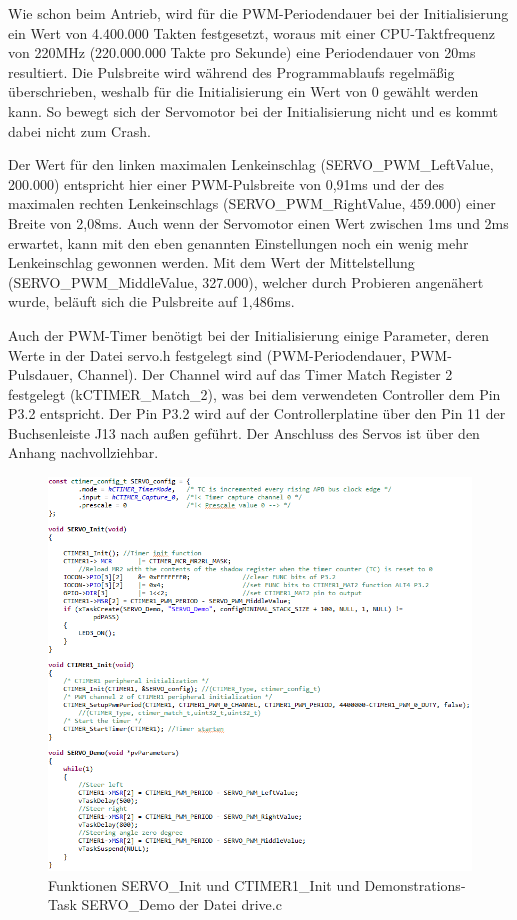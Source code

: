 Wie schon beim Antrieb, wird für die \ac{PWM}-Periodendauer bei der Initialisierung ein Wert von 4.400.000 Takten festgesetzt, woraus mit einer \ac{CPU}-Taktfrequenz von 220MHz (220.000.000 Takte pro Sekunde) eine Periodendauer von 20ms resultiert. Die Pulsbreite wird während des Programmablaufs regelmäßig überschrieben, weshalb für die Initialisierung ein Wert von 0 gewählt werden kann. So bewegt sich der Servomotor bei der Initialisierung nicht und es kommt dabei nicht zum Crash.\vspace{11pt}

Der Wert für den linken maximalen Lenkeinschlag (\glqq{}SERVO\_PWM\_LeftValue\grqq{}, 200.000) entspricht hier einer \ac{PWM}-Pulsbreite von 0,91ms und der des maximalen rechten Lenkeinschlags (\glqq{}SERVO\_PWM\_RightValue\grqq{}, 459.000) einer Breite von 2,08ms. Auch wenn der Servomotor einen Wert zwischen 1ms und 2ms erwartet, kann mit den eben genannten Einstellungen noch ein wenig mehr Lenkeinschlag gewonnen werden. Mit dem Wert der Mittelstellung (\glqq{}SERVO\_PWM\_MiddleValue\grqq{}, 327.000), welcher durch Probieren angenähert wurde, beläuft sich die Pulsbreite auf 1,486ms.\vspace{11pt}

Auch der \ac{PWM}-Timer benötigt bei der Initialisierung einige Parameter, deren Werte in der Datei \glqq{}servo.h\grqq{} festgelegt sind (\ac{PWM}-Periodendauer, \ac{PWM}-Pulsdauer, Channel). Der Channel wird auf das Timer Match Register 2 festgelegt (\glqq{}kCTIMER\_Match\_2\grqq{}), was bei dem verwendeten Controller dem Pin P3.2 entspricht. Der Pin P3.2 wird auf der Controllerplatine über den Pin 11 der Buchsenleiste J13 nach außen geführt. Der Anschluss des Servos ist über den Anhang \glqq{}\grqq{} nachvollziehbar.

\begin{figure}[H] %
\includegraphics[width=.90\textwidth]{sec5/images/ServoC} 
\centering
\captionsetup{width=.95\textwidth}
\caption[Funktionen SERVO\_Init, CTIMER1\_Init und SERVO\_Demo der Datei \glqq{}drive.c\grqq{}]{Funktionen SERVO\_Init und CTIMER1\_Init und Demonstrations-Task SERVO\_Demo der Datei \glqq{}drive.c\grqq{}}\centering
\label{fig:ServoC}
\end{figure}

